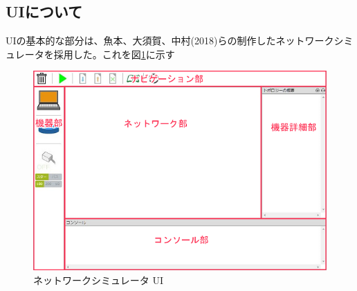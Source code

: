 \subsection{UIについて}
UIの基本的な部分は、魚本、大須賀、中村(2018)らの制作したネットワークシミュレータを採用した。これを図\ref{fig:simu}に示す

\begin{figure}[htbp]
  \begin{center}
    \includegraphics{simu.png}
    \caption{ネットワークシミュレータ UI}
    \label{fig:simu}
  \end{center}
\end{figure}
